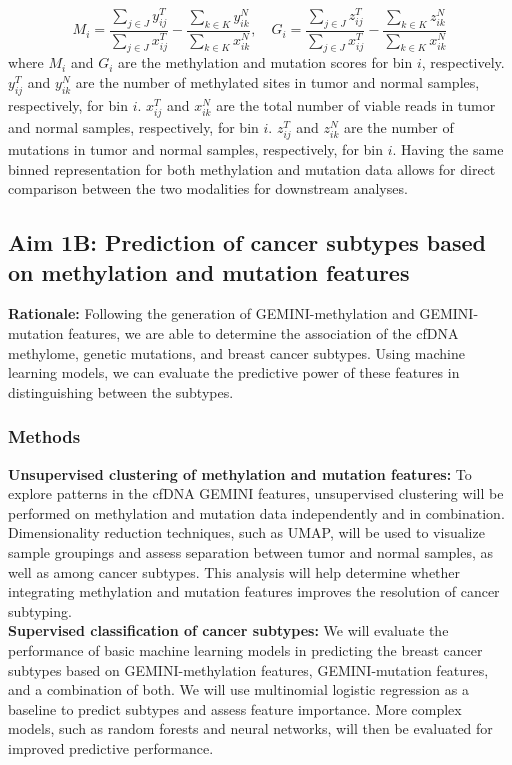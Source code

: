 \documentclass[11pt]{article}
\begin{document}
\begin{equation}
	M_{i} = \frac{\sum\limits_{j \in J}{y^{T}_{ij}}}{\sum\limits_{j \in J}{x^{T}_{ij}}} - 
	\frac{\sum\limits_{k \in K}{y^{N}_{ik}}}{\sum\limits_{k \in K}{x^{N}_{ik}}},
	\quad
	G_{i} = \frac{\sum\limits_{j \in J}{z^{T}_{ij}}}{\sum\limits_{j \in J}{x^{T}_{ij}}} - 
	\frac{\sum\limits_{k \in K}{z^{N}_{ik}}}{\sum\limits_{k \in K}{x^{N}_{ik}}}
\end{equation}
where $M_{i}$ and $G_{i}$ are the methylation and mutation scores for bin $i$, respectively. 
$y^{T}_{ij}$ and $y^{N}_{ik}$ are the number of methylated sites in tumor and normal samples, respectively, for bin $i$.
$x^{T}_{ij}$ and $x^{N}_{ik}$ are the total number of viable reads in tumor and normal samples, respectively, for bin $i$.
$z^{T}_{ij}$ and $z^{N}_{ik}$ are the number of mutations in tumor and normal samples, respectively, for bin $i$.
Having the same binned representation for both methylation and mutation data allows for direct comparison between the two modalities for downstream analyses.


\subsection*{Aim 1B: Prediction of cancer subtypes based on methylation and mutation features}
\textbf{Rationale:}
Following the generation of GEMINI-methylation and GEMINI-mutation features,
we are able to determine the association of the cfDNA methylome, genetic mutations,
and breast cancer subtypes. Using machine learning models, we can evaluate the 
predictive power of these features in distinguishing between the subtypes.
\subsubsection*{Methods}
\textbf{Unsupervised clustering of methylation and mutation features:}
To explore patterns in the cfDNA GEMINI features, unsupervised clustering will be performed on methylation and mutation data independently and in combination. Dimensionality reduction techniques, such as UMAP, will be used to visualize sample groupings and assess separation between tumor and normal samples, as well as among cancer subtypes. This analysis will help determine whether integrating methylation and mutation features improves the resolution of cancer subtyping.
\medskip \\
\textbf{Supervised classification of cancer subtypes:}
We will evaluate the performance of basic machine learning models in predicting the 
breast cancer subtypes based on GEMINI-methylation features, GEMINI-mutation features, and a combination of both. 
We will use multinomial logistic regression as a baseline to predict subtypes and assess feature importance. More complex models, such as random forests and neural networks, will then be evaluated for improved predictive performance.
\end{document}
